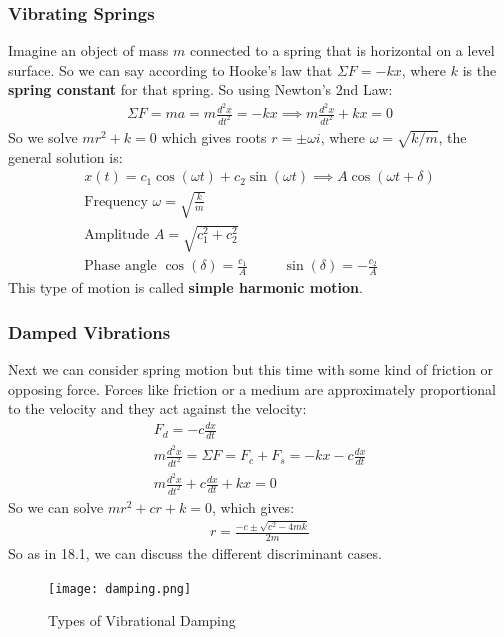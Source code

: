 \documentclass{article}
\begin{document}
\subsubsection{Vibrating Springs}
Imagine an object of mass $m$ connected to a spring that is horizontal on a level surface. So we can say according to Hooke's law that $\Sigma F = -kx$, where $k$ is the \textbf{spring constant} for that spring. So using Newton's 2nd Law:
\begin{gather*}
    \Sigma F = ma = m\frac{d^2x}{dt^2} = -kx\implies m\frac{d^2x}{dt^2}+kx = 0
\end{gather*}
So we solve $mr^2 + k = 0$ which gives roots $r = \pm \omega i$, where $\omega = \sqrt{k/m}$, the general solution is:
\begin{gather*}
    x(t) = c_1\cos(\omega t) + c_2\sin(\omega t)\implies A\cos(\omega t + \delta)\\
    \textrm{Frequency }\omega = \sqrt{\frac{k}{m}}\\
    \textrm{Amplitude }A = \sqrt{c_1^2 + c_2^2}\\
    \textrm{Phase angle } \cos(\delta) = \frac{c_1}{A}\hspace{30pt}\sin(\delta) = -\frac{c_2}{A}
\end{gather*}
This type of motion is called \textbf{simple harmonic motion}.
\subsubsection{Damped Vibrations}
Next we can consider spring motion but this time with some kind of friction or opposing force. Forces like friction or a medium are approximately proportional to the velocity and they act against the velocity:
\begin{gather*}
    F_d = -c\frac{dx}{dt}\\
    m\frac{d^2x}{dt^2} = \Sigma F = F_c + F_s = -kx - c\frac{dx}{dt}\\
    m\frac{d^2x}{dt^2}+c\frac{dx}{dt} + kx = 0
\end{gather*}
So we can solve $mr^2 + cr + k = 0$, which gives:
\begin{gather*}
    r = \frac{-c \pm \sqrt{c^2 - 4mk}}{2m}
\end{gather*}
So as in 18.1, we can discuss the different discriminant cases.
\begin{figure}[H]
\begin{center}
\texttt{[image: damping.png]}
\caption{Types of Vibrational Damping}
\label{damping}
\end{center}
\end{figure}
\end{document}
